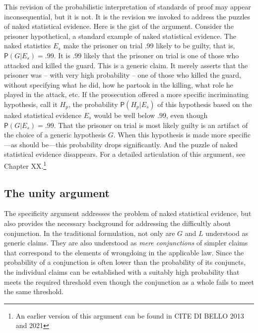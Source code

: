 \documentclass[
  10pt,
  dvipsnames,enabledeprecatedfontcommands]{scrartcl}
\newcommand{\pr}[1]{\ensuremath{\mathsf{P}(#1)}}
\begin{document}
This revision of the probabilistic interpretation of standards of proof
may appear inconsequential, but it is not. It is the revision we invoked
to address the puzzles of naked statistical evidence. Here is the gist
of the argument. Consider the prisoner hypothetical, a standard example
of naked statistical evidence. The naked statistics \(E_s\) make the
prisoner on trial .99 likely to be guilty, that is,
\(\pr{G \vert E_s} =.99\). It is \(.99\) likely that the prisoner on
trial is one of those who attacked and killed the guard. This is a
generic claim. It merely asserts that the prisoner was -- with very high
probability -- one of those who killed the guard, without specifying
what he did, how he partook in the killing, what role he played in the
attack, etc. If the prosecution offered a more specific incriminating
hypothesis, call it \(H_p\), the probability \(\pr{H_p \vert E_{s}}\) of
this hypothesis based on the naked statistical evidence \(E_s\) would be
well below \(.99\), even though \(\pr{G \vert E_s}=.99\). That the
prisoner on trial is most likely guilty is an artifact of the choice of
a generic hypothesis \(G\). When this hypothesis is made more
specific---as should be---this probability drops significantly. And the
puzzle of naked statistical evidence disappears. For a detailed
articulation of this argument, see Chapter XX.\footnote{An earlier
  version of this argument can be found in CITE DI BELLO 2013 and 2021}

\hypertarget{the-unity-argument}{%
\subsection{The unity argument}\label{the-unity-argument}}

The specificity argument addresses the problem of naked statistical
evidence, but also provides the necessary background for addressing the
difficultly about conjunction. In the traditional formulation, not only
are \(G\) and \(L\) understood as generic claims. They are also
understood as \emph{mere conjunctions} of simpler claims that correspond
to the elements of wrongdoing in the applicable law. Since the
probability of a conjunction is often lower than the probability of its
conjuncts, the individual claims can be established with a suitably high
probability that meets the required threshold even though the
conjunction as a whole fails to meet the same threshold.
\end{document}
